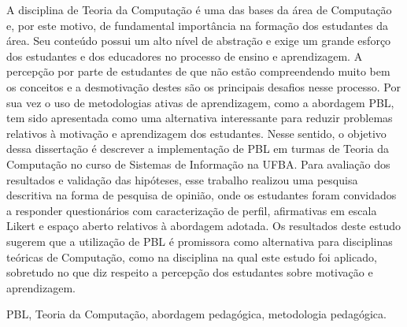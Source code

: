 \resumo
A disciplina de Teoria da Computação é uma das bases
da área de Computação e, por este motivo, de
fundamental importância na formação dos estudantes
da área.
Seu conteúdo possui um alto nível de abstração e exige
um grande esforço dos estudantes e dos educadores
no processo de ensino e aprendizagem.
A percepção por parte de estudantes de
que não estão compreendendo muito bem os conceitos e
a desmotivação destes são os principais desafios nesse processo.
Por sua vez o uso de metodologias ativas de aprendizagem, como
a abordagem \ac{PBL}, tem sido apresentada
como uma alternativa interessante para reduzir problemas relativos à motivação
e aprendizagem dos estudantes.
Nesse sentido, o objetivo dessa dissertação é descrever a implementação
de \ac{PBL} em turmas de Teoria da Computação no curso de Sistemas
de Informação na \ac{UFBA}.
Para avaliação dos resultados e validação das hipóteses,
esse trabalho realizou uma pesquisa descritiva na forma
de pesquisa de opinião, onde
os estudantes foram convidados a responder questionários com
caracterização de perfil, afirmativas em escala Likert e
espaço aberto relativos à abordagem adotada. 
Os resultados deste estudo sugerem que a utilização de \ac{PBL}
é promissora como alternativa para disciplinas teóricas
de Computação, como na disciplina na qual este estudo foi
aplicado, sobretudo no que diz respeito a percepção
dos estudantes sobre motivação e aprendizagem.
\begin{keywords}
\ac{PBL}, Teoria da Computação, abordagem pedagógica, metodologia pedagógica.
\end{keywords}
